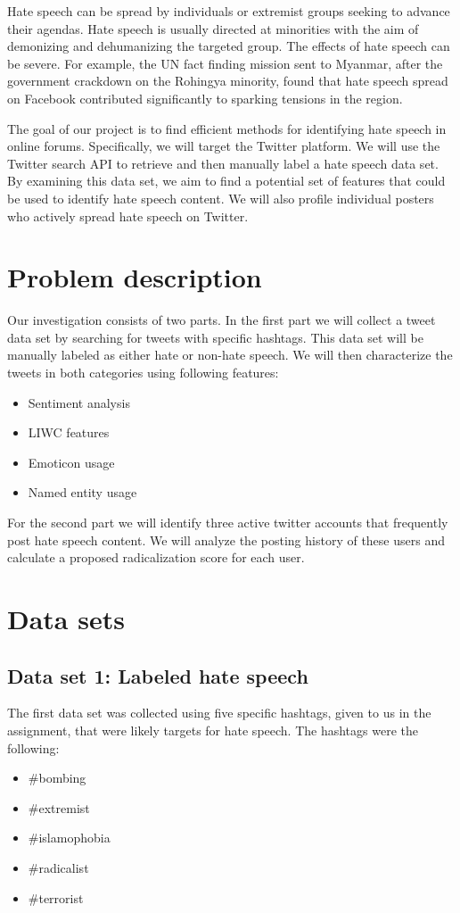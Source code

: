 \documentclass[conference]{IEEEtran}
\begin{document}
Hate speech can be spread by individuals or extremist groups seeking to advance their 
agendas. Hate speech is usually directed at minorities with the aim of demonizing and 
dehumanizing the targeted group. The effects of hate speech can be severe. For example, the 
UN fact finding mission sent to Myanmar, after the government crackdown on the Rohingya 
minority, found that hate speech spread on Facebook contributed significantly to sparking 
tensions in the region\cite{Reuters:myanmar_rohingya}.

The goal of our project is to find efficient methods for identifying hate speech in online forums.
Specifically, we will target the Twitter platform. We will use the Twitter search API to retrieve and then 
manually label a hate speech data set. By examining this data set, we aim to find a potential set of features 
that could be used to identify hate speech content.  We will also profile individual posters who actively spread 
hate speech on Twitter.

\section{Problem description}
Our investigation consists of two parts. In the first part we will collect a tweet data set by searching 
for tweets with specific hashtags. This data set will be manually labeled as either hate or 
non-hate speech. We will then characterize the tweets in both categories using following features:

\begin{itemize}
    \item Sentiment analysis
    \item LIWC features
    \item Emoticon usage
    \item Named entity usage
\end{itemize}

For the second part we will identify three active twitter accounts that frequently post 
hate speech content. We will analyze the posting history of these users and calculate a 
proposed radicalization score for each user. 

\section{Data sets}
\subsection{Data set 1: Labeled hate speech}
The first data set was collected using five specific hashtags, given to us in the assignment,
that were likely targets for hate speech. The hashtags were the following: 
\begin{itemize}
    \item \#bombing
    \item \#extremist
    \item \#islamophobia
    \item \#radicalist
    \item \#terrorist    
\end{itemize}
\end{document}
